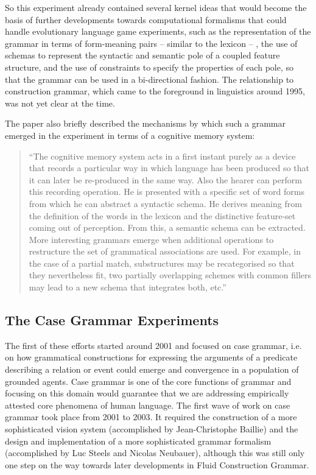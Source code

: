 So this experiment already contained several kernel ideas that would become the basis of further developments towards
computational formalisms that could handle evolutionary language game experiments, such as the 
representation of the grammar in terms of form-meaning pairs -- similar to the lexicon -- ,  
the use of schemas to represent the syntactic and semantic pole of a coupled feature structure, and the use of constraints to specify the 
properties of each pole, so that the grammar can be used in a bi-directional fashion. 
The relationship to construction grammar, which came to the foreground in linguistics 
around 1995, was not yet clear at the time. 

The paper also briefly described the mechanisms by which such a grammar emerged in the experiment in terms of a 
cognitive memory system: 

\begin{quotation}
``The cognitive memory system acts in a first instant purely as a device that records 
a particular way in which language has been produced so that it can later be re-produced in the same way.
Also the hearer can perform this recording operation. He is presented with a specific set of word forms from which he can abstract a syntactic schema. He derives meaning from the definition of the words in the lexicon and the distinctive feature-set coming out of perception. From this, a semantic schema can be extracted.
More interesting grammars emerge when additional operations to restructure the set of grammatical associations are used. For example, in the case of a partial match, substructures may be recategorised so that they nevertheless fit, two partially overlapping schemes with common fillers may lead to a new schema that integrates both, etc.''
\end{quotation}


\subsection{The Case Grammar Experiments}

The first of these efforts started around 2001 and focused on case grammar, i.e. on 
how grammatical constructions for expressing the arguments of a predicate describing a relation or
event could emerge and convergence in 
a population of grounded agents. Case grammar is one of the core functions of grammar and focusing on this domain would 
guarantee that we are addressing empirically attested core phenomena of human language. The first wave of work on case grammar
took place from 2001 to 2003. 
It required the construction of a more sophisticated vision system (accomplished by Jean-Christophe Baillie) and the 
design and implementation of a more sophisticated grammar formalism (accomplished by Luc Steels and Nicolas Neubauer), 
although this was still only one step on the way towards later developments in Fluid Construction Grammar. 

